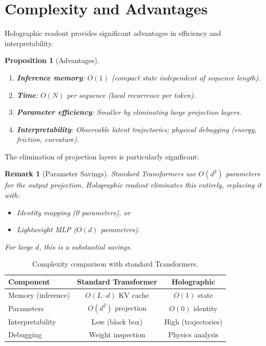 \documentclass[12pt,letterpaper,twoside]{article}
\newtheorem{remarque}{Remark}[section]
\newtheorem{prop}{Proposition}[section]
\begin{document}
\section{Complexity and Advantages}

Holographic readout provides significant advantages in efficiency and interpretability.

\begin{prop}[Advantages]
\begin{enumerate}
\item \textbf{Inference memory}: $O(1)$ (compact state independent of sequence length).
\item \textbf{Time}: $O(N)$ per sequence (local recurrence per token).
\item \textbf{Parameter efficiency}: Smaller by eliminating large projection layers.
\item \textbf{Interpretability}: Observable latent trajectories; physical debugging (energy, friction, curvature).
\end{enumerate}
\end{prop}

The elimination of projection layers is particularly significant:

\begin{remarque}[Parameter Savings]
Standard Transformers use $O(d^2)$ parameters for the output projection. Holographic readout eliminates this entirely, replacing it with:
\begin{itemize}
\item Identity mapping (0 parameters), or
\item Lightweight MLP ($O(d)$ parameters).
\end{itemize}
For large $d$, this is a substantial savings.
\end{remarque}

\begin{table}[htbp]
\centering
\begin{tabular}{lcc}
\toprule
Component & Standard Transformer & Holographic \\ \midrule
Memory (inference) & $O(L \cdot d)$ KV cache & $O(1)$ state \\
Parameters & $O(d^2)$ projection & $O(0)$ identity \\
Interpretability & Low (black box) & High (trajectories) \\
Debugging & Weight inspection & Physics analysis \\ \bottomrule
\end{tabular}
\caption{Complexity comparison with standard Transformers.}
\label{tab:complexity}
\end{table}
\end{document}

